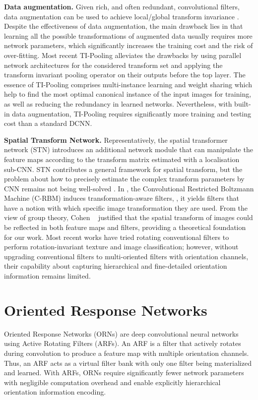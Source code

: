 \documentclass[10pt,twocolumn,letterpaper]{article}
\begin{document}
    \textbf{Data augmentation.}
    Given rich, and often redundant, convolutional filters, data augmentation can be used to achieve local/global transform invariance \cite{VanDyk2012}. Despite the effectiveness of data augmentation, the main drawback lies in that learning all the possible transformations of augmented data usually requires more network parameters, which significantly increases the training cost and the risk of over-fitting. Most recent TI-Pooling \cite{Laptev2016} alleviates the drawbacks by using parallel network architectures for the considered transform set and applying the transform invariant pooling operator on their outputs before the top layer. The essence of TI-Pooling comprises multi-instance learning and weight sharing which help to find the most optimal canonical instance of the input images for training, as well as reducing the redundancy in learned networks. Nevertheless, with built-in data augmentation, TI-Pooling requires significantly more training and testing cost than a standard DCNN.

    \textbf{Spatial Transform Network.}
    Representatively, the spatial transformer network (STN) \cite{Jaderberg2015} introduces an additional network module that can manipulate the feature maps according to the transform matrix estimated with a localisation sub-CNN. STN contributes a general framework for spatial transform, but the problem about how to precisely estimate the complex transform parameters by CNN remains not being well-solved \cite{Goodfellow2014, Radford2015}.
    In \cite{Kivinen2011, Schmidt2012}, the Convolutional Restricted Boltzmann Machine (C-RBM) induces transformation-aware filters, \ie, it yields filters that have a notion with which specific image transformation they are used.
    From the view of group theory, Cohen \etal~\cite{Cohen2016} justified that the spatial transform of images could be reflected in both feature maps and filters, providing a theoretical foundation for our work.
    Most recent works \cite{Wu2015,Marcos2016} have tried rotating conventional filters to perform rotation-invariant texture and image classification; however, without upgrading conventional filters to multi-oriented filters with orientation channels, their capability about capturing hierarchical and fine-detailed orientation information remains limited.


\section{Oriented Response Networks}
    Oriented Response Networks (ORNs) are deep convolutional neural networks using Active Rotating Filters (ARFs).
    An ARF is a filter that actively rotates during convolution to produce a feature map with multiple orientation channels. Thus, an ARF acts as a virtual filter bank with only one filter being materialized and learned.
    With ARFs, ORNs require significantly fewer network parameters with negligible computation overhead and enable explicitly hierarchical orientation information encoding.
\end{document}
